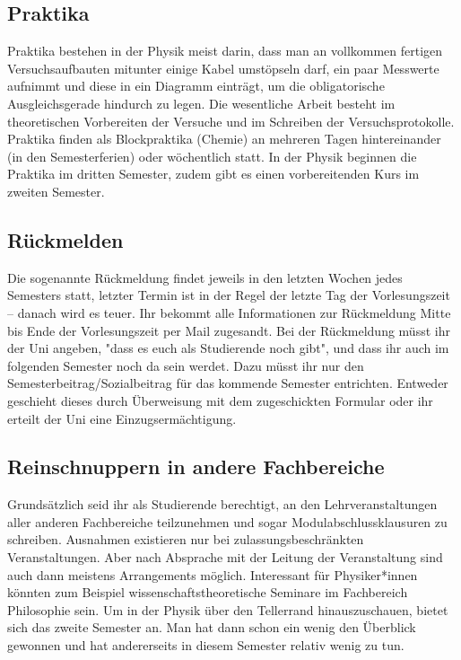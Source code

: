 \begin{multicols}{2}
\subsection{Praktika}
Praktika bestehen in der Physik meist darin, dass man an vollkommen fertigen Versuchsaufbauten mitunter einige Kabel umstöpseln darf, ein paar Messwerte aufnimmt und diese in ein Diagramm einträgt, um die obligatorische Ausgleichsgerade hindurch zu legen.
Die wesentliche Arbeit besteht im theoretischen Vorbereiten der Versuche und im Schreiben der Versuchsprotokolle.
Praktika finden als Blockpraktika (Chemie) an mehreren Tagen hintereinander (in den Semesterferien) oder wöchentlich statt.
In der Physik beginnen die Praktika im dritten Semester, zudem gibt es einen vorbereitenden Kurs im zweiten Semester.

\subsection{Rückmelden}
Die sogenannte Rückmeldung findet jeweils in den letzten Wochen jedes Semesters statt, letzter Termin ist in der Regel der letzte Tag der Vorlesungszeit -- danach wird es teuer.
Ihr bekommt alle Informationen zur Rückmeldung Mitte bis Ende der Vorlesungszeit per Mail zugesandt.
Bei der Rückmeldung müsst ihr der Uni angeben, "dass es euch als Studierende noch gibt", und dass ihr auch im folgenden Semester noch da sein werdet.
Dazu müsst ihr nur den Semesterbeitrag/Sozialbeitrag für das kommende Semester entrichten.
Entweder geschieht dieses durch Überweisung mit dem zugeschickten Formular oder ihr erteilt der Uni eine Einzugsermächtigung.

\subsection{Reinschnuppern in andere Fachbereiche}
Grundsätzlich seid ihr als Studierende berechtigt, an den Lehrveranstaltungen aller anderen Fachbereiche teilzunehmen und sogar Modulabschlussklausuren zu schreiben.
Ausnahmen existieren nur bei zulassungsbeschränkten Veranstaltungen.
Aber nach Absprache mit der Leitung der Veranstaltung sind auch dann meistens Arrangements möglich.
Interessant für Physiker*innen könnten zum Beispiel wissenschaftstheoretische Seminare im Fachbereich Philosophie sein.
Um in der Physik über den Tellerrand hinauszuschauen, bietet sich das zweite Semester an.
Man hat dann schon ein wenig den Überblick gewonnen und hat andererseits in diesem Semester relativ wenig zu tun.

\end{multicols}
